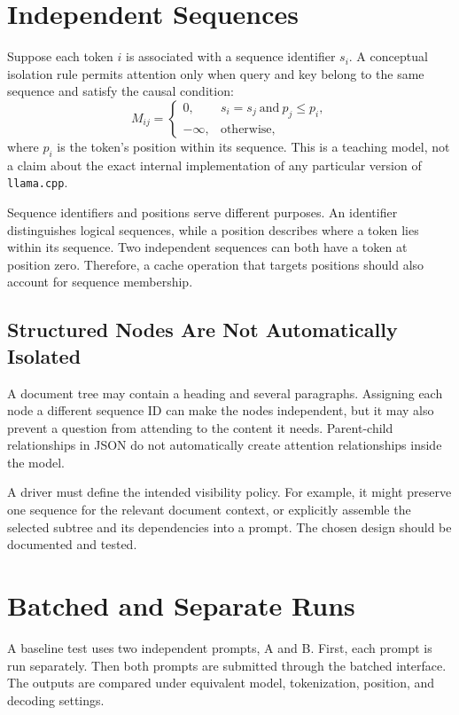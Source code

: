 \documentclass{article}
\begin{document}
\section{Independent Sequences}
Suppose each token $i$ is associated with a sequence identifier $s_i$. A conceptual isolation rule permits attention only when query and key belong to the same sequence and satisfy the causal condition:
\begin{equation}
M_{ij}=
\begin{cases}
0, & s_i=s_j\ \text{and}\ p_j\leq p_i,\\
-\infty, & \text{otherwise},
\end{cases}
\end{equation}
where $p_i$ is the token's position within its sequence. This is a teaching model, not a claim about the exact internal implementation of any particular version of \texttt{llama.cpp}.

Sequence identifiers and positions serve different purposes. An identifier distinguishes logical sequences, while a position describes where a token lies within its sequence. Two independent sequences can both have a token at position zero. Therefore, a cache operation that targets positions should also account for sequence membership.

\subsection{Structured Nodes Are Not Automatically Isolated}
A document tree may contain a heading and several paragraphs. Assigning each node a different sequence ID can make the nodes independent, but it may also prevent a question from attending to the content it needs. Parent-child relationships in JSON do not automatically create attention relationships inside the model.

A driver must define the intended visibility policy. For example, it might preserve one sequence for the relevant document context, or explicitly assemble the selected subtree and its dependencies into a prompt. The chosen design should be documented and tested.

\section{Batched and Separate Runs}
A baseline test uses two independent prompts, A and B. First, each prompt is run separately. Then both prompts are submitted through the batched interface. The outputs are compared under equivalent model, tokenization, position, and decoding settings.
\end{document}
